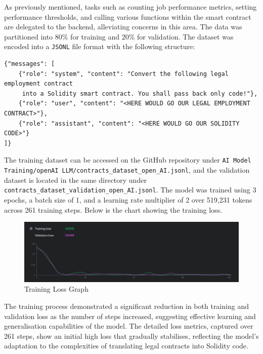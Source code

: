 As previously mentioned, tasks such as counting job performance metrics, setting performance thresholds, and calling various functions within the smart contract are delegated to the backend, alleviating concerns in this area. The data was partitioned into 80\% for training and 20\% for validation. The dataset was encoded into a \texttt{JSONL} file format with the following structure:

\begin{verbatim}
{"messages": [
    {"role": "system", "content": "Convert the following legal employment contract 
     into a Solidity smart contract. You shall pass back only code!"},
    {"role": "user", "content": "<HERE WOULD GO OUR LEGAL EMPLOYMENT CONTRACT>"},
    {"role": "assistant", "content": "<HERE WOULD GO OUR SOLIDITY CODE>"}
]}
\end{verbatim}

The training dataset can be accessed on the GitHub repository under \texttt{AI Model Training/openAI LLM/contracts\_dataset\_open\_AI.jsonl}, and the validation dataset is located in the same directory under \texttt{contracts\_dataset\_validation\_open\_AI.jsonl}. The model was trained using 3 epochs, a batch size of 1, and a learning rate multiplier of 2 over 519,231 tokens across 261 training steps. Below is the chart showing the training loss.

\begin{figure}[!ht]
    \centering
    \includegraphics[width=1\textwidth]{LATEX/Appendices/Images/Software/AI Model/training_validation_loss_graph.png}
    \caption{Training Loss Graph}
    \label{fig:training_loss_graph}
\end{figure}

The training process demonstrated a significant reduction in both training and validation loss as the number of steps increased, suggesting effective learning and generalisation capabilities of the model. The detailed loss metrics, captured over 261 steps, show an initial high loss that gradually stabilises, reflecting the model’s adaptation to the complexities of translating legal contracts into Solidity code.

